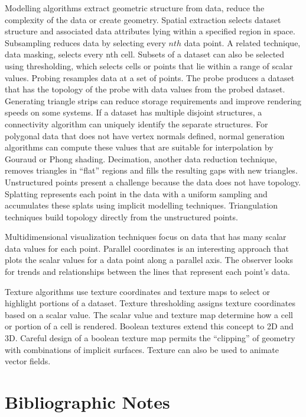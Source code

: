 Modelling algorithms extract geometric structure from data, reduce the complexity of the data or create geometry. Spatial extraction selects dataset structure and associated data attributes lying within a specified region in space. Subsampling reduces data by selecting every $n{th}$ data point. A related technique, data masking, selects every nth cell. Subsets of a dataset can also be selected using thresholding, which selects cells or points that lie within a range of scalar values. Probing resamples data at a set of points. The probe produces a dataset that has the topology of the probe with data values from the probed dataset. Generating triangle strips can reduce storage requirements and improve rendering speeds on some systems. If a dataset has multiple disjoint structures, a connectivity algorithm can uniquely identify the separate structures. For polygonal data that does not have vertex normals defined, normal generation algorithms can compute these values that are suitable for interpolation by Gouraud or Phong shading. Decimation, another data reduction technique, removes triangles in ``flat'' regions and fills the resulting gaps with new triangles. Unstructured points present a challenge because the data does not have topology. Splatting represents each point in the data with a uniform sampling and accumulates these splats using implicit modelling techniques. Triangulation techniques build topology directly from the unstructured points.

Multidimensional visualization techniques focus on data that has many scalar data values for each point. Parallel coordinates is an interesting approach that plots the scalar values for a data point along a parallel axis. The observer looks for trends and relationships between the lines that represent each point's data.

Texture algorithms use texture coordinates and texture maps to select or highlight portions of a dataset. Texture thresholding assigns texture coordinates based on a scalar value. The scalar value and texture map determine how a cell or portion of a cell is rendered. Boolean textures extend this concept to 2D and 3D. Careful design of a boolean texture map permits the ``clipping'' of geometry with combinations of implicit surfaces. Texture can also be used to animate vector fields.

\section{Bibliographic Notes}
\label{sec:bibliographic_notes.ch09}

